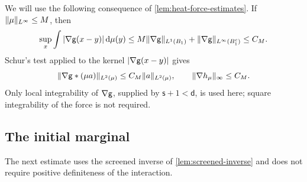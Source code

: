 \documentclass[11pt,reqno]{amsart}
\numberwithin{equation}{section}
\theoremstyle{plain}
\theoremstyle{remark}
\DeclarePairedDelimiter{\norm}{\lVert}{\rVert}
\renewcommand{\d}{\mathsf{d}}\newcommand{\s}{\mathsf{s}}
\begin{document}
We will use the following consequence of \cref{lem:heat-force-estimates}. If $\norm\mu_{L^\infty}\le M$, then
\begin{equation}\label{eq:force-schur-row}
 \sup_x\int|\nabla\g(x-y)|\dd\mu(y)
 \le M\norm{\nabla\g}_{L^1(B_1)}
       +\norm{\nabla\g}_{L^\infty(B_1^c)}\le C_M.
\end{equation}
Schur's test applied to the kernel $|\nabla\mathsf g(x-y)|$ gives
\begin{equation}\label{eq:force-schur}
 \norm{\nabla\g*(\mu a)}_{L^2(\mu)}\le C_M\norm a_{L^2(\mu)},\qquad
 \norm{\nabla h_\mu}_\infty\le C_M.
\end{equation}
Only local integrability of $\nabla\mathsf g$, supplied by $\s+1<\d$, is used here; square integrability of the force is not required.

\subsection{The initial marginal}
The next estimate uses the screened inverse of \cref{lem:screened-inverse} and does not require positive definiteness of the interaction.
\end{document}
